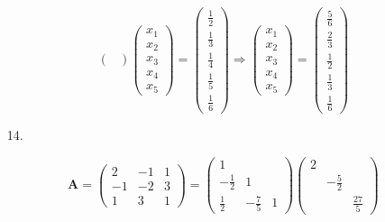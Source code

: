 \documentclass{sjtuarticle}
\begin{document}
\begin{itemize}
\begin{solution}
\begin{equation*}
\begin{pmatrix}
            \end{pmatrix}\begin{pmatrix}
                x_1 \\ x_2 \\ x_3 \\ x_4 \\ x_5
            \end{pmatrix}=\begin{pmatrix}
                \frac{1}{2} \\ \frac{1}{3} \\ \frac{1}{4} \\ \frac{1}{5} \\ \frac{1}{6}
            \end{pmatrix}\Rightarrow\begin{pmatrix}
                x_1 \\ x_2 \\ x_3 \\ x_4 \\ x_5
            \end{pmatrix}=\begin{pmatrix}
                \frac{5}{6} \\ \frac{2}{3} \\ \frac{1}{2} \\ \frac{1}{3} \\ \frac{1}{6}
            \end{pmatrix}
        \end{equation*}
    \end{solution}
    \item[14.] \begin{solution}
        \begin{equation*}
            \bm{A}=\begin{pmatrix}
                2 & -1 & 1 \\
                -1 & -2 & 3 \\
                1 & 3 & 1
            \end{pmatrix}=\begin{pmatrix}
                1 \\
                -\frac{1}{2} & 1 \\
                \frac{1}{2} & -\frac{7}{5} & 1
            \end{pmatrix}
            \begin{pmatrix}
                2 \\
                & -\frac{5}{2} \\
                & & \frac{27}{5}

\end{pmatrix}
\end{equation*}
\end{solution}
\end{itemize}
\end{document}
